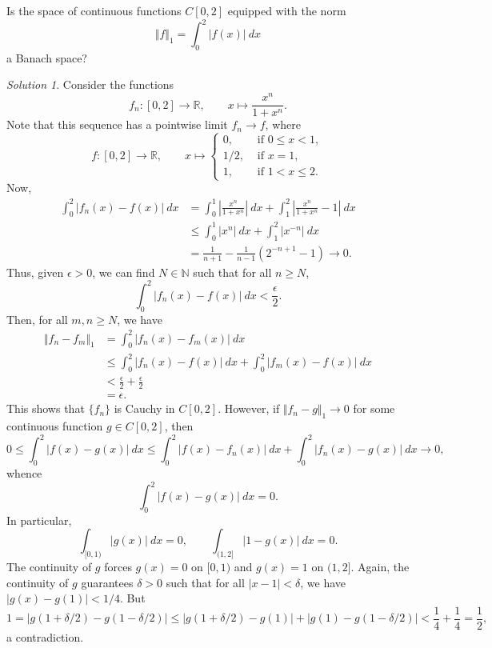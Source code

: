 \documentclass[11pt]{article}
\newcommand{\R}{\mathbb{R}}
\newcommand{\N}{\mathbb{N}}
\newcommand{\norm}[1]{\Vert #1 \Vert}
\theoremstyle{definition}
\theoremstyle{remark}
\newtheorem*{solution}{Solution}
\begin{document}
    \begin{exercise}
        Is the space of continuous functions $C[0, 2]$ equipped with the norm \[
            \norm{f}_1 = \int_0^2 |f(x)|\:dx
        \] a Banach space?
        \begin{solution}
            Consider the functions \[
                f_n\colon [0, 2] \to \R, \qquad x \mapsto \frac{x^n}{1 + x^n}.
            \] Note that this sequence has a pointwise limit $f_n \to f$, where \[
                f\colon [0, 2] \to \R, \qquad x \mapsto \begin{cases}
                    0, &\text{ if } 0 \leq x < 1, \\
                    1 / 2, &\text{ if } x = 1, \\
                    1, &\text{ if } 1 < x \leq 2.
                \end{cases}
            \] Now, \begin{align*}
                \int_0^2 |f_n(x) - f(x)|\:dx
                &= \int_0^1 \left|\frac{x^n}{1 + x^n}\right|\:dx + \int_1^2
                \left|\frac{x^n}{1 + x^n} - 1\right|\:dx \\
                &\leq \int_0^1 |x^n|\:dx + \int_1^2 |x^{-n}|\:dx \\
                &= \frac{1}{n + 1} - \frac{1}{n - 1}(2^{-n + 1} - 1) \to 0.
            \end{align*}
            Thus, given $\epsilon > 0$, we can find $N \in \N$ such that for all $n
            \geq N$, \[
                \int_0^2 |f_n(x) - f(x)|\:dx < \frac{\epsilon}{2}.
            \] Then, for all $m, n \geq N$, we have \begin{align*}
                \norm{f_n - f_m}_1 &= \int_0^2 |f_n(x) - f_m(x)|\:dx \\
                &\leq \int_0^2 |f_n(x) - f(x)| \:dx + \int_0^2 |f_m(x) - f(x)|\:dx \\
                &< \frac{\epsilon}{2} + \frac{\epsilon}{2} \\
                &= \epsilon.
            \end{align*}
            This shows that $\{f_n\}$ is Cauchy in $C[0, 2]$. However, if $\norm{f_n
            - g}_1 \to 0$ for some continuous function $g \in C[0, 2]$, then \[
                0 \leq \int_0^2 |f(x) - g(x)|\:dx \leq \int_0^2 |f(x) - f_n(x)|\:dx +
                \int_0^2 |f_n(x) - g(x)|\:dx \to 0,
            \] whence \[
                \int_0^2 |f(x) - g(x)|\:dx = 0.
            \] In particular, \[
                \int_{[0, 1)} |g(x)|\:dx = 0, \qquad \int_{(1, 2]} |1
                - g(x)|\:dx = 0.
            \] The continuity of $g$ forces $g(x) = 0$ on $[0, 1)$
            and $g(x) = 1$ on $(1, 2]$. Again, the continuity of $g$ guarantees
            $\delta > 0$ such that for all $|x - 1| < \delta$, we have $|g(x) - g(1)|
            < 1 / 4$.  But \[
                1 = |g(1 + \delta / 2) - g(1 - \delta / 2)| \leq |g(1 + \delta / 2) -
                g(1)| + |g(1) - g(1 - \delta / 2)| < \frac{1}{4} + \frac{1}{4} =
                \frac{1}{2},
            \] a contradiction.


\end{solution}
\end{exercise}
\end{document}
